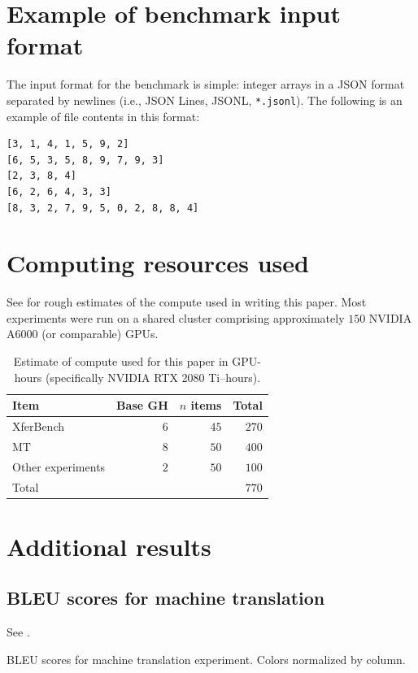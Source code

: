 \section{Example of benchmark input format}
\unskip\label{sec:input-example}

The input format for the benchmark is simple: integer arrays in a JSON format separated by newlines (i.e., JSON Lines, JSONL, {\small\texttt{{}*.jsonl}}).
The following is an example of file contents in this format:
\begin{verbatim}
[3, 1, 4, 1, 5, 9, 2]
[6, 5, 3, 5, 8, 9, 7, 9, 3]
[2, 3, 8, 4]
[6, 2, 6, 4, 3, 3]
[8, 3, 2, 7, 9, 5, 0, 2, 8, 8, 4]
\end{verbatim}



\section{Computing resources used}
See  for rough estimates of the compute used in writing this paper.
Most experiments were run on a shared cluster comprising approximately $150$ NVIDIA A6000 (or comparable) GPUs.
\begin{table}
  \centering
  \begin{tabular}{lrrr}
    \toprule
    Item & Base GH & $n$ items & Total \\
    \midrule
    XferBench         & $6$ & $45$ & $270$ \\
    MT                & $8$ & $50$ & $400$ \\
    Other experiments & $2$ & $50$ & $100$ \\
    \midrule
    Total             & & & $770$ \\
    \bottomrule
  \end{tabular}
  \caption{Estimate of compute used for this paper in GPU-hours (specifically NVIDIA RTX 2080 Ti--hours).}
  \unskip\label{tab:compute}
\end{table}


\section{Additional results}

\subsection{BLEU scores for machine translation}
\unskip\label{sec:mt-bleu}
See .
\begin{table}
  \centering
  \caption{BLEU scores for machine translation experiment.  Colors normalized by column.}
  \unskip\label{tab:mt-bleu}
\end{table}

